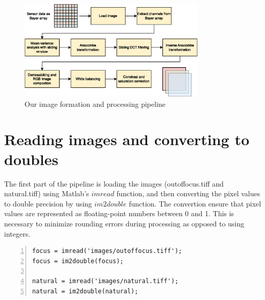 \documentclass[12pt,a4paper,english
]{tunithesis}
\begin{document}
\begin{figure}[h]
  \centering
  \includegraphics[width=0.8\textwidth]{img/image_pipeline.eps}
  \caption{Our image formation and processing pipeline}
  \label{fig:pipeline}
\end{figure}

\section{Reading images and converting to doubles}
The first part of the pipeline is loading the images (outoffocus.tiff and natural.tiff) using Matlab's $imread$ function, and then converting the pixel values to double precision by using $im2double$ function. The convertion ensure that pixel values are represented as floating-point numbers between 0 and 1. This is necessary to minimize rounding errors during processing as opposed to using integers.
\begin{lstlisting}[style=Matlab-editor, numbers=left, basicstyle=\footnotesize]
% 1. Load image and convert to double
focus = imread('images/outoffocus.tiff');
focus = im2double(focus);

natural = imread('images/natural.tiff');
natural = im2double(natural);
\end{lstlisting}
\end{document}
